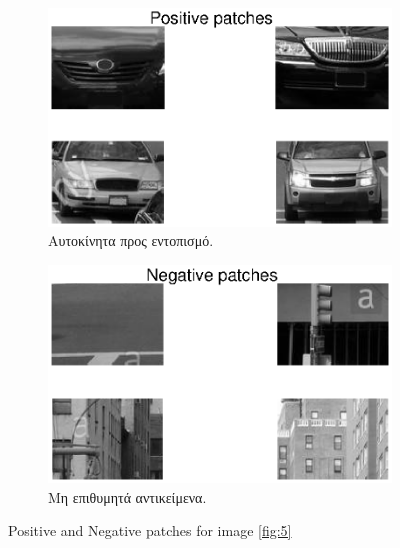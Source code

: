 \documentclass{article}
\newcommand{\tl}[1]{\textlatin{#1}}
\begin{document}
	\begin{figure}[H]
		\centering
		\begin{subfigure}[b]{0.5\textwidth}
			\centering
			\includegraphics[width=\textwidth]{res/car_15_11_pos.eps}	
			\caption{Αυτοκίνητα προς εντοπισμό.}
		\end{subfigure}%
		\begin{subfigure}[b]{0.5\textwidth}
			\includegraphics[width=\textwidth]{res/car_15_11_neg.eps}
			\caption{Μη επιθυμητά αντικείμενα.}
		\end{subfigure}%
		\caption{\tl{Positive and Negative patches for image \ref{fig:5}}}
		\label{fig:6}
	\end{figure}
\end{document}
